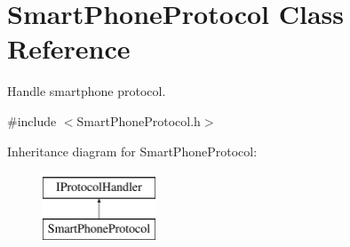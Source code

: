 \hypertarget{class_smart_phone_protocol}{\section{Smart\-Phone\-Protocol Class Reference}
\label{class_smart_phone_protocol}
}


Handle smartphone protocol.  




{\ttfamily \#include $<$Smart\-Phone\-Protocol.\-h$>$}

Inheritance diagram for Smart\-Phone\-Protocol\-:\begin{figure}[H]
\begin{center}
\leavevmode
\includegraphics[height=2.000000cm]{class_smart_phone_protocol}
\end{center}
\end{figure}
